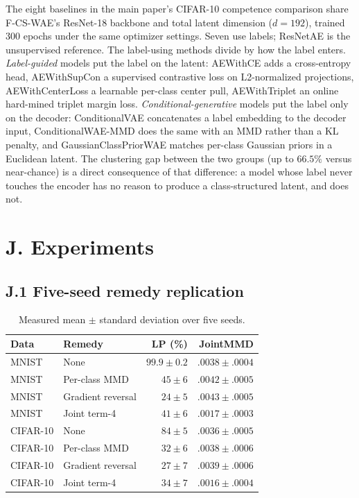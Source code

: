 \documentclass[letterpaper]{article} %
\newcommand{\ours}{F-CS-WAE}
\begin{document}
The eight baselines in the main paper's CIFAR-10 competence comparison share
\ours{}'s ResNet-18 backbone and total latent dimension ($d{=}192$), trained
300 epochs under the same optimizer settings. Seven use labels; ResNetAE is
the unsupervised reference. The label-using methods divide by how the label
enters. \emph{Label-guided} models put the label on the latent: AEWithCE adds
a cross-entropy head, AEWithSupCon a supervised contrastive loss on
L2-normalized projections, AEWithCenterLoss a learnable per-class center pull,
AEWithTriplet an online hard-mined triplet margin loss.
\emph{Conditional-generative} models put the label only on the decoder:
ConditionalVAE concatenates a label embedding to the decoder input,
ConditionalWAE-MMD does the same with an MMD rather than a KL penalty, and
GaussianClassPriorWAE matches per-class Gaussian priors in a Euclidean latent.
The clustering gap between the two groups (up to $66.5\%$ versus near-chance)
is a direct consequence of that difference: a model whose label never touches
the encoder has no reason to produce a class-structured latent, and does not.

\section{J. Experiments}

\subsection{J.1 Five-seed remedy replication}

\begin{table}[h]

\centering
\scriptsize
\setlength{\tabcolsep}{3pt}
\caption{Measured mean $\pm$ standard deviation over five seeds.}
\label{tab:remedy-five-seed}
\begin{tabular}{llrr}
\toprule
Data & Remedy & LP (\%) & JointMMD \\
\midrule
MNIST & None & $99.9\pm0.2$ & $.0038\pm.0004$ \\
MNIST & Per-class MMD & $45\pm6$ & $.0042\pm.0005$ \\
MNIST & Gradient reversal & $24\pm5$ & $.0043\pm.0005$ \\
MNIST & Joint term-4 & $41\pm6$ & $.0017\pm.0003$ \\
\midrule
CIFAR-10 & None & $84\pm5$ & $.0036\pm.0005$ \\
CIFAR-10 & Per-class MMD & $32\pm6$ & $.0038\pm.0006$ \\
CIFAR-10 & Gradient reversal & $27\pm7$ & $.0039\pm.0006$ \\
CIFAR-10 & Joint term-4 & $34\pm7$ & $.0016\pm.0004$ \\
\bottomrule
\end{tabular}
\end{table}
\end{document}
